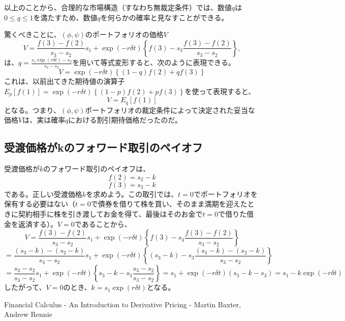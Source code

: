 \documentclass[uplatex,a4j,12pt,dvipdfmx]{jsarticle}
\begin{document}
以上のことから、合理的な市場構造（すなわち無裁定条件）では、数値$q$は$0 \le q \le 1$を満たすため、数値$q$を何らかの確率と見なすことができる。

驚くべきことに、$(\phi, \psi)$のポートフォリオの価格$V$\[V = \frac{f(3) - f(2)}{s_3 - s_2} s_1 + \exp(-r\delta t) \left\{ f(3) - s_3 \frac{f(3) - f(2)}{s_3 - s_2} \right\},\]は、$q = \frac{s_1 \exp(r\delta t) - s_2}{s_3 - s_2}$を用いて等式変形すると、次のように表現できる。
\[V = \exp(-r\delta t) \left\{ (1-q)f(2) + qf(3) \right\}\]
これは、以前出てきた期待値の演算子$E_p[f(1)] = \exp(-r\delta t) \left\{ (1-p)f(2) + pf(3) \right\}$を使って表現すると、\[V = E_q[f(1)]\]となる。つまり、$(\phi, \psi)$ポートフォリオの裁定条件によって決定された妥当な価格$V$は、実は確率$q$における割引期待価格だったのだ。

\subsection{受渡価格がkのフォワード取引のペイオフ}
受渡価格が$k$のフォワード取引のペイオフは、
\[f(2) = s_2 - k\]
\[f(3) = s_3 - k\]
である。正しい受渡価格$k$を求めよう。この取引では、$t=0$でポートフォリオを保有する必要はない（$t=0$で債券を借りて株を買い、そのまま満期を迎えたときに契約相手に株を引き渡してお金を得て、最後はそのお金で$t=0$で借りた借金を返済する）。$V=0$であることから、
\[V = \frac{f(3) - f(2)}{s_3 - s_2} s_1 + \exp(-r\delta t) \left\{ f(3) - s_3 \frac{f(3) - f(2)}{s_3 - s_2} \right\} \]
\[= \frac{(s_3-k) - (s_2-k)}{s_3 - s_2} s_1 + \exp(-r\delta t) \left\{ (s_3-k) - s_3 \frac{(s_3-k) - (s_2-k)}{s_3 - s_2} \right\}\]
\[= \frac{s_3 - s_2}{s_3 - s_2} s_1 + \exp(-r\delta t) \left\{ s_3 - k - s_3 \frac{s_3 - s_2}{s_3 - s_2} \right\} = s_1 + \exp(-r\delta t) (s_3 - k - s_3) = s_1 - k \exp(-r\delta t)\]
したがって、$V=0$のとき、$k = s_1 \exp(r\delta t)$となる。

\begin{thebibliography}{9}
	Financial Calculus - An Introduction to Derivative Pricing - Martin Baxter, Andrew Rennie
\end{thebibliography}
\end{document}
